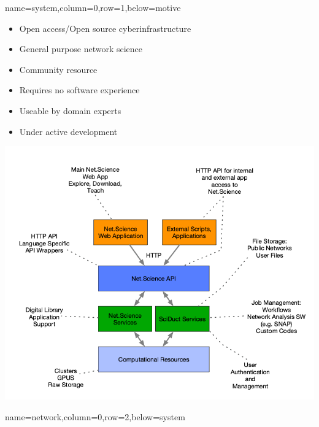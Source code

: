 \documentclass[landscape,paperwidth=70in,paperheight=46in,fontscale=0.225]{baposter} %
\begin{document}
\begin{poster}
{}
          {name=system,column=0,row=1,below=motive}{

\begin{minipage}{.5\textwidth}
\begin{itemize}[leftmargin=*,noitemsep,topsep=0pt]
\item Open access/Open source cyberinfrastructure
\item General purpose network science
\item Community resource
\item Requires no software experience
\item Useable by domain experts
\item Under active development
\end{itemize}
\end{minipage}
\hfill
\begin{minipage}{.5\textwidth}
\begin{center}
\includegraphics[scale=0.2]{figures/sys_descr.png}
\end{center}
\end{minipage}
}

          {name=network,column=0,row=2,below=system}{         

}
\end{poster}
\end{document}
